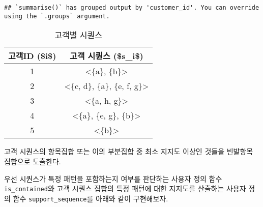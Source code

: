 \documentclass[
]{book}
\begin{document}
\begin{verbatim}
## `summarise()` has grouped output by 'customer_id'. You can override using the `.groups` argument.
\end{verbatim}

\begin{table}

\caption{\label{tab:sequential-transaction-data}고객별 시퀀스}
\centering
\begin{tabular}[t]{cc}
\toprule
고객ID (\$i\$) & 고객 시퀀스 (\$s\_i\$)\\
\midrule
1 & <\{a\}, \{b\}>\\
2 & <\{c, d\}, \{a\}, \{e, f, g\}>\\
3 & <\{a, h, g\}>\\
4 & <\{a\}, \{e, g\}, \{b\}>\\
5 & <\{b\}>\\
\bottomrule
\end{tabular}
\end{table}

고객 시퀀스의 항목집합 또는 이의 부분집합 중 최소 지지도 이상인 것들을 빈발항목 집합으로 도출한다.

우선 시퀀스가 특정 패턴을 포함하는지 여부를 판단하는 사용자 정의 함수 \texttt{is\_contained}와 고객 시퀀스 집합의 특정 패턴에 대한 지지도를 산출하는 사용자 정의 함수 \texttt{support\_sequence}를 아래와 같이 구현해보자.
\end{document}
